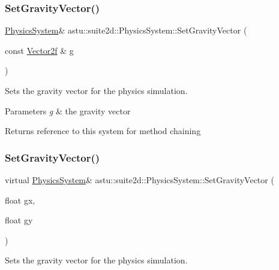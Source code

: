 \subsubsection{\texorpdfstring{Set\+Gravity\+Vector()}{SetGravityVector()}\hspace{0.1cm}{\footnotesize\ttfamily [1/2]}}
{\footnotesize\ttfamily \hyperlink{classastu_1_1suite2d_1_1PhysicsSystem}{Physics\+System}\& astu\+::suite2d\+::\+Physics\+System\+::\+Set\+Gravity\+Vector (\begin{DoxyParamCaption}\item[{const \hyperlink{classastu_1_1Vector2}{Vector2f} \&}]{g }\end{DoxyParamCaption})\hspace{0.3cm}{\ttfamily [inline]}}

Sets the gravity vector for the physics simulation.


\begin{DoxyParams}{Parameters}
{\em g} & the gravity vector \\
\hline
\end{DoxyParams}
\begin{DoxyReturn}{Returns}
reference to this system for method chaining 
\end{DoxyReturn}
\mbox{\label{classastu_1_1suite2d_1_1PhysicsSystem_a8f2d8df268662d355445f0120a7db412}} 
\subsubsection{\texorpdfstring{Set\+Gravity\+Vector()}{SetGravityVector()}\hspace{0.1cm}{\footnotesize\ttfamily [2/2]}}
{\footnotesize\ttfamily virtual \hyperlink{classastu_1_1suite2d_1_1PhysicsSystem}{Physics\+System}\& astu\+::suite2d\+::\+Physics\+System\+::\+Set\+Gravity\+Vector (\begin{DoxyParamCaption}\item[{float}]{gx,  }\item[{float}]{gy }\end{DoxyParamCaption})\hspace{0.3cm}{\ttfamily [pure virtual]}}

Sets the gravity vector for the physics simulation.


